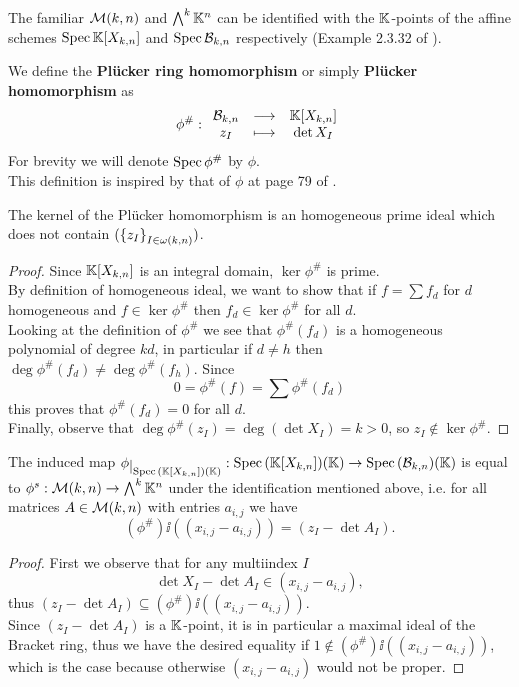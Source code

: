\begin{remark}
The familiar $\mathcal{M}(k,n)$ and $\bigwedge^k\mathbb{K}^n$ can be identified with the $\mathbb{K}$-points of the affine schemes $\mathrm{Spec}\, \mathbb{K}[X_{k,n}]$ and $\mathrm{Spec}\, \mathcal{B}_{k,n}$ respectively (Example 2.3.32 of \cite{QingLiu}).
\end{remark}

\begin{definition}
We define the \textbf{Pl\"ucker ring homomorphism} or simply \textbf{Pl\"ucker homomorphism} as
\[\phi^\#:\begin{array}{ccc} {\mathcal{B}_{k,n}} & \longrightarrow & {\mathbb{K}[X_{k,n}]}\\ {z_I} & \longmapsto & {\det X_I} \end{array}\]
For brevity we will denote $\mathrm{Spec}\, \phi^\#$ by $\phi$.\\
This definition is inspired by that of $\phi$ at page 79 of \cite{matroids}.
\end{definition}

\begin{proposition}
The kernel of the Pl\"ucker homomorphism is an homogeneous prime ideal which does not contain $(\left\{{z_I}\right\}_{I\in\omega(k,n)})$.
\end{proposition}
\begin{proof}
Since $\mathbb{K}[X_{k,n}]$ is an integral domain, $\ker\phi^\#$ is prime.\\
By definition of homogeneous ideal, we want to show that if $f=\sum f_d$ for $d$ homogeneous and $f\in \ker\phi^\#$ then $f_d\in \ker \phi^\#$ for all $d$.\\
Looking at the definition of $\phi^\#$ we see that $\phi^\#(f_d)$ is a homogeneous polynomial of degree $kd$, in particular if $d\neq h$ then $\deg \phi^\#(f_d)\neq \deg \phi^\#(f_h)$. Since
\[0=\phi^\#(f)=\sum \phi^\#(f_d)\]
this proves that $\phi^\#(f_d)=0$ for all $d$.\\
Finally, observe that $\deg\phi^\#(z_I)=\deg(\det X_I)=k>0$, so $z_I\notin \ker\phi^\#$.
\end{proof}

\begin{proposition}\label{PluckerRingHomomorphismWorksForKPoints}
The induced map $\phi\res{\Spec(\K[X_{k,n}])(\K)}:\Spec(\K[X_{k,n}])(\K)\to \Spec(\Bc_{k,n})(\K)$ is equal to $\phi^s:\mathcal{M}(k,n)\to \bigwedge^k\mathbb{K}^n$ under the identification mentioned above, i.e. for all matrices $A\in\mathcal{M}(k,n)$ with entries $a_{i,j}$ we have
\[(\phi^\#)\ii((x_{i,j}-a_{i,j}))=(z_I-\det A_I).\]
\end{proposition}
\begin{proof}
First we observe that for any multiindex $I$
\[\det X_I-\det A_I\in (x_{i,j}-a_{i,j}),\]
thus $(z_I-\det A_I)\subseteq (\phi^\#)\ii((x_{i,j}-a_{i,j}))$.\\
Since $(z_I-\det A_I)$ is a $\mathbb{K}$-point, it is in particular a maximal ideal of the Bracket ring, thus we have the desired equality if $1\notin (\phi^\#)\ii((x_{i,j}-a_{i,j}))$, which is the case because otherwise $(x_{i,j}-a_{i,j})$ would not be proper.
\end{proof}

